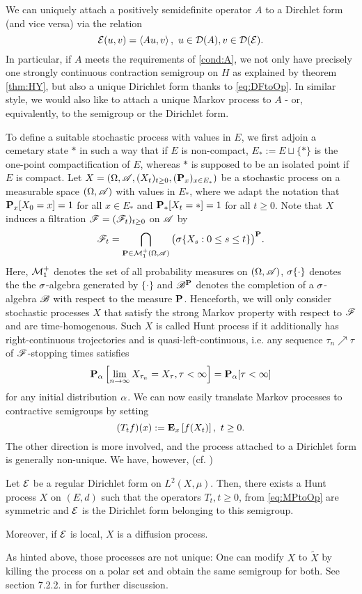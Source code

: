 We can uniquely attach a positively semidefinite operator $A$ to a Dirchlet form (and vice versa) via the relation 
\begin{equation}\label{eq:DFtoOp}
  \cE(u,v)=\left<Au,v\right>,\  u\in\cD(A),v\in\cD(\cE).
\end{equation}
In particular, if $A$ meets the requirements of \ref{cond:A}, we not only have precisely one strongly continuous contraction semigroup on $H$ as explained by theorem \ref{thm:HY}, but also a unique Dirichlet form thanks to \eqref{eq:DFtoOp}. In similar style, we would also like to attach a unique Markov process to $A$ - or, equivalently, to the semigroup or the Dirichlet form. 

To define a suitable stochastic process with values in $E$, we first adjoin a cemetary state $*$ in such a way that if $E$ is non-compact, $E_*:=E\sqcup\{*\}$ is the one-point compactification of $E$, whereas $*$ is supposed to be an isolated point if $E$ is compact. Let $X=\left(\gO,\scA,(X_t)_{t\geq0},(\Prob_x)_{x\in E_*}\right)$ be a stochastic process on a measurable space $(\gO,\scA)$ with values in $E_*$, where we adapt the notation that $\Prob_x[X_0=x]=1$ for all 
$x\in E_*$ and $\Prob_*[X_t=*]=1$ for all $t\geq0$. Note that $X$ induces a filtration $\scF=(\scF_t)_{t\geq0}$ on $\scA$ by 
\[
  \scF_t=\bigcap_{\Prob\in\cM^+_1(\gO,\scA)} \big(\gs\{X_s:0\leq s\leq t\}\big)^\Prob.
\]
Here, $\cM^+_1$ denotes the set of all probability measures on $(\gO,\scA)$, $\gs\{\cdot\}$ denotes the the $\gs$-algebra generated by $\{\cdot\}$ and $\scB^\Prob$ denotes the completion of a $\gs$-algebra $\scB$ with respect to the measure $\Prob$. Henceforth, we will only consider stochastic processes $X$ that satisfy the strong Markov property with respect to $\scF$ and are time-homogenous. Such $X$ is called Hunt process if it additionally has right-continuous trojectories and is quasi-left-continuous, i.e.  any sequence $\tau_n\nearrow\tau$ of $\scF$-stopping times satisfies
\[
  \Prob_\ga\left[\lim_{n\to\infty} X_{\tau_n}=X_\tau,\tau<\infty\right]=\Prob_\ga[\tau<\infty]
\]
for any initial distribution $\ga$. We can now easily translate Markov processes to contractive semigroups by setting
\begin{equation}\label{eq:MPtoOp}
  (T_tf)(x):=\PTEp{f(X_t)}{x},\ t\geq0.
\end{equation}
The other direction is more involved, and the process attached to a Dirichlet form is generally non-unique. We have, however, (cf. \cite[theorems 7.2.1 and 7.2.2]{fukushima2011dirichlet})
\begin{thm}
  Let $\cE$ be a regular Dirichlet form on $L^2(X,\mu)$. Then, there exists a Hunt process $X$ on $(E,d)$ such that the operators $T_t, t\geq0$, from \eqref{eq:MPtoOp} are symmetric and $\cE$ is the Dirichlet form belonging to this semigroup.
  
  Moreover, if $\cE$ is local, $X$ is a diffusion process.
\end{thm}
As hinted above, those processes are not unique: One can modify $X$ to $\tilde X$ by killing the process on a polar set and obtain the same semigroup for both. See section 7.2.2. in \cite{fukushima2011dirichlet} for further discussion.


